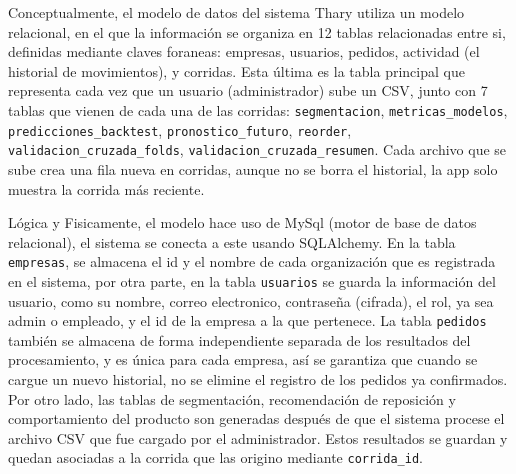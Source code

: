 Conceptualmente, el modelo de datos del sistema Thary utiliza un modelo relacional, en el que la información se organiza en 12 tablas relacionadas entre si, definidas mediante claves foraneas: empresas, usuarios, pedidos, actividad (el historial de movimientos), y corridas. Esta última es la tabla principal que representa cada vez que un usuario (administrador) sube un CSV, junto con 7 tablas que vienen de cada una de las corridas: \texttt{segmentacion}, \texttt{metricas\_modelos}, \texttt{predicciones\_backtest}, \texttt{pronostico\_futuro}, \texttt{reorder}, \texttt{validacion\_cruzada\_folds}, \texttt{validacion\_cruzada\_resumen}. Cada archivo que se sube crea una fila nueva en corridas, aunque no se borra el historial, la app solo muestra la corrida más reciente.

Lógica y Fisicamente, el modelo hace uso de MySql (motor de base de datos relacional), el sistema se conecta a este usando SQLAlchemy. En la tabla \texttt{empresas}, se almacena el id y el nombre de cada organización que es registrada en el sistema, por otra parte, en la tabla \texttt{usuarios} se guarda la información del usuario, como su nombre, correo electronico, contraseña (cifrada), el rol, ya sea admin o empleado, y el id de la empresa a la que pertenece. La tabla \texttt{pedidos} también se almacena de forma independiente separada de los resultados del procesamiento, y es única para cada empresa, así se garantiza que cuando se cargue un nuevo historial, no se elimine el registro de los pedidos ya confirmados. Por otro lado, las tablas de segmentación, recomendación de reposición y comportamiento del producto son generadas después de que el sistema procese el archivo CSV que fue cargado por el administrador. Estos resultados se guardan y quedan asociadas a la corrida que las origino mediante \texttt{corrida\_id}.

